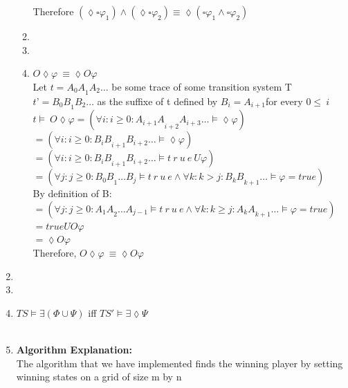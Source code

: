 \documentclass[a4paper,12pt]{article}
\begin{document}
\begin{enumerate}
\begin{enumerate}
			Therefore $(\lozenge\square\varphi_1)\wedge(\lozenge\square\varphi_2)\equiv\lozenge(\square\varphi_1\wedge\square\varphi_2)$\\
			\item
			\item
			\item 	$O\lozenge\varphi\ \equiv\lozenge O\varphi$\\
			Let $t={A_0A}_1A_2\ldots$ be some trace of some transition system T\\
			$t’ = {B_0B}_1B_2\ldots$ as the suffixe of t defined by $B_i=A_{i+1}$for every $0\le\ i$\\
			
			$t \models\ O\lozenge\varphi=\left(\forall
			i:i\geq0:{A_{i+1}A}_{i+2}A_{i+3}\ldots\models\lozenge\varphi\right)$\\
			$=\left(\forall i:i\geq0:{B_iB}_{i+1}B_{i+2}\ldots\models\lozenge\varphi\right)$\\
			$=\left(\forall i:i\geq0:{B_iB}_{i+1}B_{i+2}\ldots\models t\ r\ u\ e\ U\varphi\right)$\\
			$=\left(\forall j:j\geq0:{B_0B}_1{\ldots B}_j\models t\ r\ u\ e\land\forall k:k>j:{B_kB}_{k+1}\ldots\models\varphi=true\right)$\\
			
			By definition of B:
			$=\left(\forall j:j\geq0:{A_1A}_2{\ldots A}_{j-1}\models t\ r\ u\ e\land\forall k:k\geq j:{A_kA}_{k+1}\ldots\models\varphi=true\right)$\\
			$=true U O\varphi$\\
			$= \lozenge O\varphi$\\
			
			Therefore, $O\lozenge\varphi\ \equiv\lozenge O\varphi$
			
			
		\end{enumerate}
		\item 
		\item 
		\item $TS\models\exists(\Phi\cup\Psi)$ iff $TS' \models \exists\lozenge\Psi$\\\\
		\item 
		
		\textbf{Algorithm Explanation:}\\
		
		The algorithm that we have implemented finds the winning player by setting winning states on a grid of size m by n\\
		

\end{enumerate}
\end{document}
